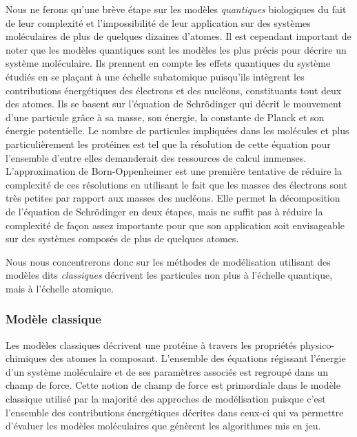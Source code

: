 Nous ne ferons qu'une brève étape sur les modèles \textit{quantiques} biologiques du fait de leur complexité et l'impossibilité de leur application sur des systèmes moléculaires de plus de quelques dizaines d'atomes. Il est cependant important de noter que les modèles quantiques sont les modèles les plus précis pour décrire un système moléculaire. Ils prennent en compte les effets quantiques du système étudiés en se plaçant à une échelle subatomique puisqu'ils intègrent les contributions énergétiques des électrons et des nucléons, constituants tout deux des atomes. Ils se basent sur l'équation de Schrödinger \cite{schrodinger1926undulatory} qui décrit le mouvement d'une particule grâce à sa masse, son énergie, la constante de Planck et son énergie potentielle. Le nombre de particules impliquées dans les molécules et plus particulièrement les protéines est tel que la résolution de cette équation pour l'ensemble d'entre elles demanderait des ressources de calcul immenses. L'approximation de Born-Oppenheimer \cite{} est une première tentative de réduire la complexité de ces résolutions en utilisant le fait que les masses des électrons sont très petites par rapport aux masses des nucléons. Elle permet la décomposition de l'équation de Schrödinger en deux étapes, mais ne suffit pas à réduire la complexité de façon assez importante pour que son application soit envisageable sur des systèmes composés de plus de quelques atomes.

Nous nous concentrerons donc sur les méthodes de modélisation utilisant des modèles dits \textit{classiques} décrivent les particules non plus à l'échelle quantique, mais à l'échelle atomique.

\subsubsection{Modèle classique} \label{forcefield}

Les modèles classiques décrivent une protéine à travers les propriétés physico-chimiques des atomes la composant. L'ensemble des équations régissant l'énergie d'un système moléculaire et de ses paramètres associés est regroupé dans un champ de force. Cette notion de champ de force est primordiale dans le modèle classique utilisé par la majorité des approches de modélisation puisque c’est l'ensemble des contributions énergétiques décrites dans ceux-ci qui va permettre d'évaluer les modèles moléculaires que génèrent les algorithmes mis en jeu.

